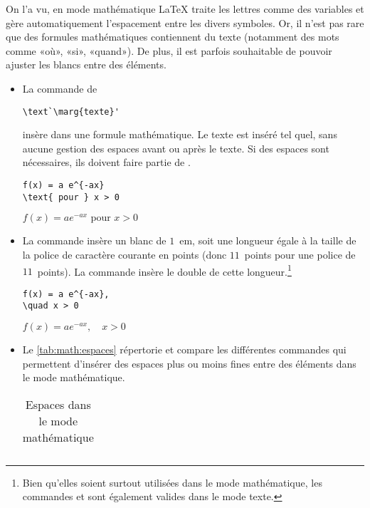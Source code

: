 On l'a vu, en mode mathématique {\LaTeX} traite les lettres comme des
variables et gère automatiquement l'espacement entre les divers
symboles. Or, il n'est pas rare que des formules mathématiques
contiennent du texte (notamment des mots comme «où», «si», «quand»).
De plus, il est parfois souhaitable de pouvoir ajuster les blancs
entre des éléments.
\begin{itemize}
\item La commande de 
\begin{lstlisting}
\text`\marg{texte}'
\end{lstlisting}
  insère  dans une formule mathématique. Le texte est
  inséré tel quel, sans aucune gestion des espaces avant ou après le
  texte. Si des espaces sont nécessaires, ils doivent faire partie de
  .
  \begin{demo}
    \begin{texample}
\begin{lstlisting}
f(x) = a e^{-ax}
\text{ pour } x > 0
\end{lstlisting}
      \producing
      $f(x) = a e^{-ax} \text{ pour } x > 0$
    \end{texample}
  \end{demo}
\item La commande \cmd{\quad} insère un blanc de $1$~em, soit une
  longueur égale à la taille de la police de caractère courante en
  points (donc $11$~points pour une police de $11$~points). La
  commande \cmd{\qquad} insère le double de cette longueur.\footnote{%
    Bien qu'elles soient surtout utilisées dans le mode mathématique,
    les commandes \cmd{\quad} et \cmd{\qquad} sont également valides
    dans le mode texte.}
  \begin{demo}
    \begin{texample}
\begin{lstlisting}
f(x) = a e^{-ax},
\quad x > 0
\end{lstlisting}
      \producing
      $f(x) = a e^{-ax}, \quad x > 0$
    \end{texample}
  \end{demo}
\item Le \autoref{tab:math:espaces} répertorie et compare les
  différentes commandes qui permettent d'insérer des espaces plus ou
  moins fines entre des éléments dans le mode mathématique.
  \begin{table}
    \caption{Espaces dans le mode mathématique}
    \label{tab:math:espaces}
    \centering
    \begin{tabular}{lll}

\end{tabular}
\end{table}
\end{itemize}
